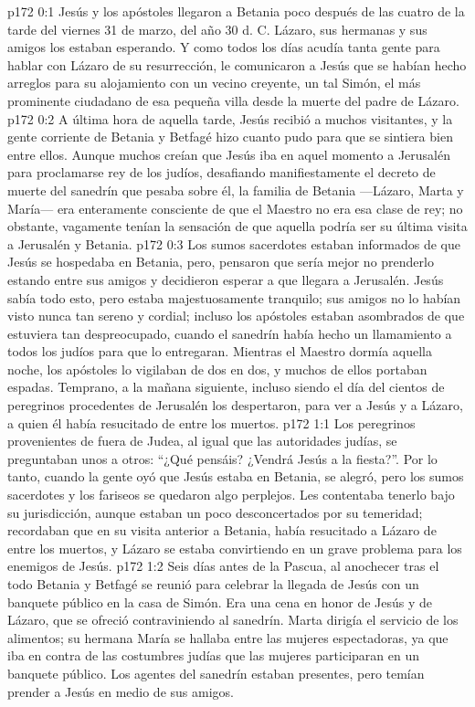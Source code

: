 \author{Comisión de seres intermedios}
\vs p172 0:1 Jesús y los apóstoles llegaron a Betania poco después de las cuatro de la tarde del viernes 31 de marzo, del año 30 d. C. Lázaro, sus hermanas y sus amigos los estaban esperando. Y como todos los días acudía tanta gente para hablar con Lázaro de su resurrección, le comunicaron a Jesús que se habían hecho arreglos para su alojamiento con un vecino creyente, un tal Simón, el más prominente ciudadano de esa pequeña villa desde la muerte del padre de Lázaro.
\vs p172 0:2 A última hora de aquella tarde, Jesús recibió a muchos visitantes, y la gente corriente de Betania y Betfagé hizo cuanto pudo para que se sintiera bien entre ellos. Aunque muchos creían que Jesús iba en aquel momento a Jerusalén para proclamarse rey de los judíos, desafiando manifiestamente el decreto de muerte del sanedrín que pesaba sobre él, la familia de Betania ---Lázaro, Marta y María--- era enteramente consciente de que el Maestro no era esa clase de rey; no obstante, vagamente tenían la sensación de que aquella podría ser su última visita a Jerusalén y Betania.
\vs p172 0:3 Los sumos sacerdotes estaban informados de que Jesús se hospedaba en Betania, pero, pensaron que sería mejor no prenderlo estando entre sus amigos y decidieron esperar a que llegara a Jerusalén. Jesús sabía todo esto, pero estaba majestuosamente tranquilo; sus amigos no lo habían visto nunca tan sereno y cordial; incluso los apóstoles estaban asombrados de que estuviera tan despreocupado, cuando el sanedrín había hecho un llamamiento a todos los judíos para que lo entregaran. Mientras el Maestro dormía aquella noche, los apóstoles lo vigilaban de dos en dos, y muchos de ellos portaban espadas. Temprano, a la mañana siguiente, incluso siendo el día del  cientos de peregrinos procedentes de Jerusalén los despertaron, para ver a Jesús y a Lázaro, a quien él había resucitado de entre los muertos.
\vs p172 1:1 Los peregrinos provenientes de fuera de Judea, al igual que las autoridades judías, se preguntaban unos a otros: “¿Qué pensáis? ¿Vendrá Jesús a la fiesta?”. Por lo tanto, cuando la gente oyó que Jesús estaba en Betania, se alegró, pero los sumos sacerdotes y los fariseos se quedaron algo perplejos. Les contentaba tenerlo bajo su jurisdicción, aunque estaban un poco desconcertados por su temeridad; recordaban que en su visita anterior a Betania, había resucitado a Lázaro de entre los muertos, y Lázaro se estaba convirtiendo en un grave problema para los enemigos de Jesús.
\vs p172 1:2 Seis días antes de la Pascua, al anochecer tras el  todo Betania y Betfagé se reunió para celebrar la llegada de Jesús con un banquete público en la casa de Simón. Era una cena en honor de Jesús y de Lázaro, que se ofreció contraviniendo al sanedrín. Marta dirigía el servicio de los alimentos; su hermana María se hallaba entre las mujeres espectadoras, ya que iba en contra de las costumbres judías que las mujeres participaran en un banquete público. Los agentes del sanedrín estaban presentes, pero temían prender a Jesús en medio de sus amigos.
